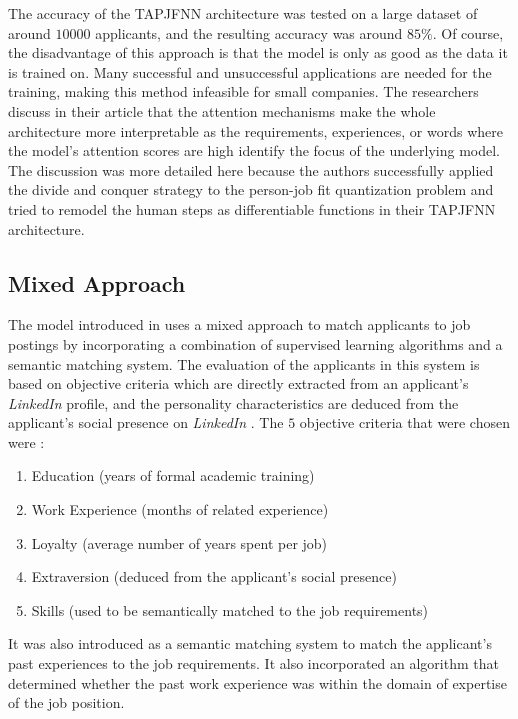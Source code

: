 \documentclass[draft,final]{thesisclass} %
\begin{document}
The accuracy of the \gls{TAPJFNN} architecture was tested on a large dataset of around $10000$ applicants, and the resulting accuracy was around $85\%$.
Of course, the disadvantage of this approach is that the model is only as good as the data it is trained on. Many successful and unsuccessful applications are needed for the training, making this method infeasible for small companies.
The researchers discuss in their article that the attention mechanisms make the whole architecture more interpretable as the requirements, experiences, or words where the model's attention scores are high identify the focus of the underlying model.
The discussion was more detailed here because the authors successfully applied the divide and conquer strategy to the person-job fit quantization problem and tried to remodel the human steps as differentiable functions in their \gls{TAPJFNN} architecture.

\subsection{Mixed Approach}
The model introduced in \textcite[517]{applicant_semantic_matching} uses a mixed approach to match applicants to job postings by incorporating a combination of supervised learning algorithms and a semantic matching system.
The evaluation of the applicants in this system is based on objective criteria which are directly extracted from an applicant's \textit{LinkedIn} profile, and the personality characteristics are deduced from the applicant's social presence on \textit{LinkedIn} \parencite[517]{applicant_semantic_matching}.
The $5$ objective criteria that were chosen were \parencite[518]{applicant_semantic_matching}:
\begin{enumerate}
    \item Education (years of formal academic training)
    \item Work Experience (months of related experience)
    \item Loyalty (average number of years spent per job)
    \item Extraversion (deduced from the applicant's social presence)
    \item Skills (used to be semantically matched to the job requirements)
\end{enumerate}
It was also introduced as a semantic matching system to match the applicant's past experiences to the job requirements. It also incorporated an algorithm that determined whether the past work experience was within the domain of expertise of the job position.
\end{document}
